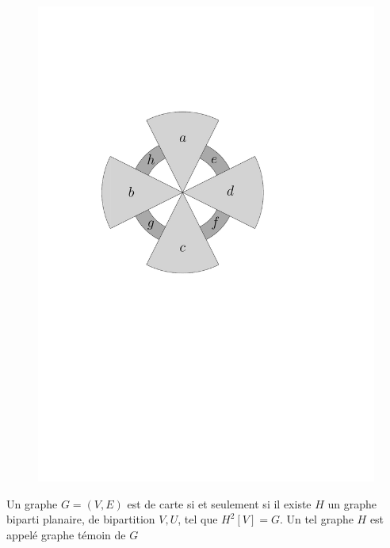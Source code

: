 \documentclass{scrartcl}
\begin{document}
\begin{flushleft}
\begin{figure}[h]
\begin{center}
    \hspace*{2.5cm}
    \includegraphics[page=\ipeFigexcarte, scale = 0.5]{figs}
    \end{center}
\end{figure}

\begin{theorem}\label{carCarte}
    Un graphe $G = (V, E)$ est de carte si et seulement si il existe $H$ un graphe biparti planaire, de bipartition $V, U$,
    tel que $H^2[V] = G$. Un tel graphe $H$ est appelé graphe témoin de $G$
\end{theorem}


\end{flushleft}
\end{document}
